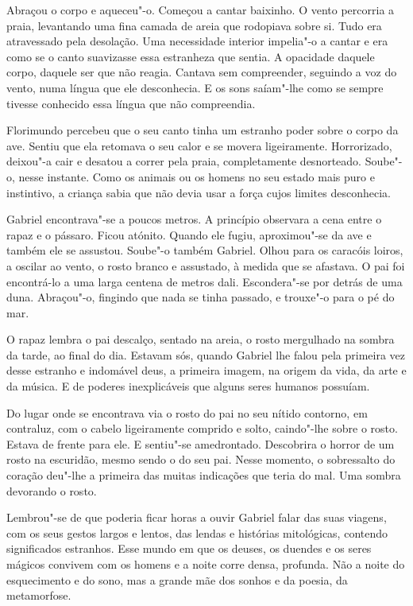 Abraçou o corpo e aqueceu"-o. Começou a cantar baixinho. O vento
percorria a praia, levantando uma fina camada de areia que rodopiava
sobre si. Tudo era atravessado pela desolação. Uma necessidade interior
impelia"-o a cantar e era como se o canto suavizasse essa estranheza que
sentia. A opacidade daquele corpo, daquele ser que não reagia. Cantava
sem compreender, seguindo a voz do vento, numa língua que ele
desconhecia. E os sons saíam"-lhe como se sempre tivesse conhecido essa
língua que não compreendia.

Florimundo percebeu que o seu canto tinha um estranho poder sobre o
corpo da ave. Sentiu que ela retomava o seu calor e se movera
ligeiramente. Horrorizado, deixou"-a cair e desatou a correr pela praia,
completamente desnorteado. Soube"-o, nesse instante. Como os animais ou
os homens no seu estado mais puro e instintivo, a criança sabia que não
devia usar a força cujos limites desconhecia.

Gabriel encontrava"-se a poucos metros. A princípio observara a cena
entre o rapaz e o pássaro. Ficou atónito. Quando ele fugiu, aproximou"-se
da ave e também ele se assustou. Soube"-o também Gabriel. Olhou para os
caracóis loiros, a oscilar ao vento, o rosto branco e assustado, à
medida que se afastava. O pai foi encontrá-lo a uma larga centena de
metros dali. Escondera"-se por detrás de uma duna. Abraçou"-o, fingindo
que nada se tinha passado, e trouxe"-o para o pé do mar.

O rapaz lembra o pai descalço, sentado na areia, o rosto mergulhado na
sombra da tarde, ao final do dia. Estavam sós, quando Gabriel lhe falou
pela primeira vez desse estranho e indomável deus, a primeira imagem, na
origem da vida, da arte e da música. E de poderes inexplicáveis que
alguns seres humanos possuíam.

Do lugar onde se encontrava via o rosto do pai no seu nítido contorno,
em contraluz, com o cabelo ligeiramente comprido e solto, caindo"-lhe
sobre o rosto. Estava de frente para ele. E sentiu"-se amedrontado.
Descobrira o horror de um rosto na escuridão, mesmo sendo o do seu pai.
Nesse momento, o sobressalto do coração deu"-lhe a primeira das muitas
indicações que teria do mal. Uma sombra devorando o rosto.

Lembrou"-se de que poderia ficar horas a ouvir Gabriel falar das suas
viagens, com os seus gestos largos e lentos, das lendas e histórias
mitológicas, contendo significados estranhos. Esse mundo em que os
deuses, os duendes e os seres mágicos convivem com os homens e a noite
corre densa, profunda. Não a noite do esquecimento e do sono, mas a
grande mãe dos sonhos e da poesia, da metamorfose.

